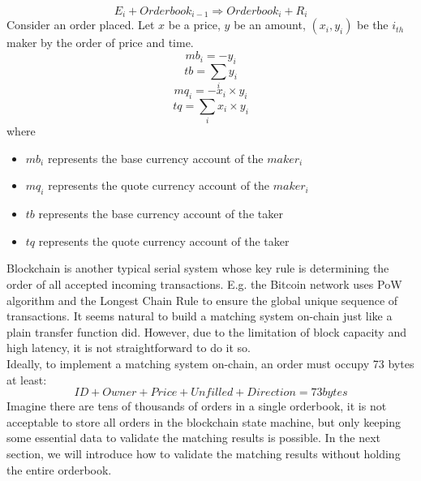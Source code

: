 \documentclass[a4paper,12pt]{article}
\begin{document}
\begin{equation*}
    E_{i} + Orderbook_{i-1} \Rightarrow Orderbook_{i} + R_{i}
\end{equation*}
Consider an order placed. Let \(x\) be a price, \(y\) be an amount,  \((x_{i}, y_{i})\) be the \(i_{th}\) maker by the order of price and time.\\
\begin{equation*}
    mb_{i}=-y_{i}
\end{equation*}
\begin{equation*}
    tb=\sum\limits_{i} y_{i}
\end{equation*}
\begin{equation*}
    mq_{i}=-x_{i} \times y_{i}
\end{equation*}
\begin{equation*}
    tq=\sum\limits_{i} x_{i} \times y_{i}
\end{equation*}
where\\
\begin{itemize}
    \item $mb_{i}$ represents the base currency account of the $maker_{i}$
    \item $mq_{i}$ represents the quote currency account of the $maker_{i}$
    \item $tb$ represents the base currency account of the taker
    \item $tq$ represents the quote currency account of the taker
\end{itemize}
Blockchain is another typical serial system whose key rule is determining the order of all accepted incoming transactions. E.g. the Bitcoin network uses PoW algorithm and the Longest Chain Rule to ensure the global unique sequence of transactions. It seems natural to build a matching system on-chain just like a plain transfer function did. However, due to the limitation of block capacity and high latency, it is not straightforward to do it so.\\
Ideally, to implement a matching system on-chain, an order must occupy 73 bytes at least:\\
\begin{equation*}
ID + Owner + Price + Unfilled + Direction = 73 bytes
\end{equation*}
Imagine there are tens of thousands of orders in a single orderbook, it is not acceptable to store all orders in the blockchain state machine, but only keeping some essential data to validate the matching results is possible. In the next section, we will introduce how to validate the matching results without holding the entire orderbook.\\
\end{document}
